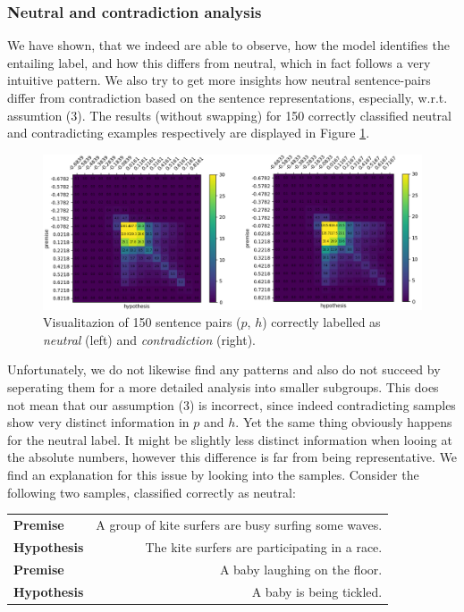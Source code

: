 \subsubsection{Neutral and contradiction analysis}
We have shown, that we indeed are able to observe, how the model identifies the entailing label, and how this differs from neutral, which in fact follows a very intuitive pattern. We also try to get more insights how neutral sentence-pairs  differ from contradiction based on the sentence representations, especially, w.r.t. assumtion (3). The results (without swapping) for 150 correctly classified neutral and contradicting examples respectively are displayed in Figure \ref{fig:neutr_contr_uninversed}.
\begin{figure}[tph!]	\centering
\includegraphics[totalheight=7cm]{fig/neutr_contr_uninversed.png}
	\caption{Visualitazion of 150 sentence pairs ($p$, $h$) correctly labelled as \textit{neutral} (left) and \textit{contradiction} (right).}
	\label{fig:neutr_contr_uninversed}
\end{figure} 
Unfortunately, we do not likewise find any patterns and also do not succeed by seperating them for a more detailed analysis into smaller subgroups. This does not mean that our assumption (3) is incorrect, since indeed contradicting samples show very distinct information in $p$ and $h$. Yet the same thing obviously happens for the neutral label. It  might be slightly less distinct information when looing at the absolute numbers, however this difference is far from being representative. We find an explanation for this issue by looking into the samples. Consider the following two samples, classified correctly as neutral:
\begin{center}
\begin{tabular}{lr}
\textbf{Premise} & A group of kite surfers are busy surfing some waves. \\
\textbf{Hypothesis} & The kite surfers are participating in a race. \\
\midrule
\textbf{Premise} & A baby laughing on the floor. \\
\textbf{Hypothesis} & A baby is being tickled.
\end{tabular}
\end{center}
